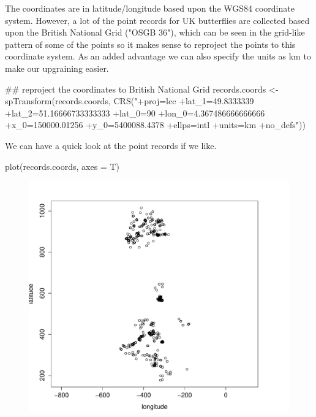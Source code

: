 \documentclass{article}[12pt, a4paper]
\begin{document}
The coordinates are in latitude/longitude based upon the WGS84 coordinate system. However, a lot of the point records for UK butterflies are collected based upon the British National Grid ("OSGB 36"), which can be seen in the grid-like pattern of some of the points so it makes sense to reproject the points to this coordinate system. As an added advantage we can also specify the units as km to make our upgraining easier.

\begin{Schunk}
\begin{Sinput}
## reproject the coordinates to British National Grid
records.coords <- spTransform(records.coords,
                              CRS("+proj=lcc 
                                   +lat_1=49.8333339 +lat_2=51.16666733333333
                                   +lat_0=90 +lon_0=4.367486666666666 
                                   +x_0=150000.01256 +y_0=5400088.4378 
                                   +ellps=intl +units=km +no_defs"))
\end{Sinput}
\end{Schunk}

We can have a quick look at the point records if we like.

\begin{Schunk}
\begin{Sinput}
plot(records.coords, axes = T)
\end{Sinput}
\end{Schunk}

\begin{figure}[!ht]
\centering
\includegraphics[width=12cm]{Downscaling-downscale30}
\end{figure}
\end{document}
